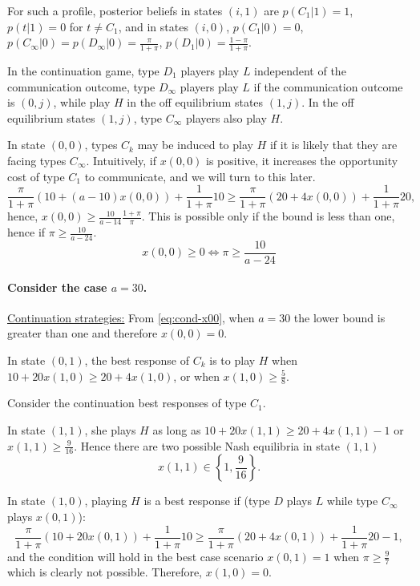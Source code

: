 \documentclass[12pt]{article}
\theoremstyle{definition}
\theoremstyle{remark}
\begin{document}
For such a profile, posterior beliefs in states $(i,1)$  are $p(C_1|1)=1$, $p(t|1)=0$ for $t\neq C_1$, and in states $(i,0)$, $p(C_1|0)=0$, $p(C_\infty|0)=p(D_\infty|0)=\frac{\pi}{1+\pi}$, $p(D_1|0)=\frac{1-\pi}{1+\pi}$.

In the continuation game, type $D_1$ players play $L$ independent of the communication outcome, type $D_\infty$ players play $L$ if the communication outcome is $(0,j)$, while play $H$ in the off equilibrium states $(1,j)$. In the off equilibrium states $(1,j)$, type $C_\infty$ players also play $H$.

In state $(0,0)$, types $C_k$ may be induced to play $H$ if it is likely that they are facing types $C_\infty$. Intuitively, if $x(0,0)$ is positive, it increases the opportunity cost of type $C_1$ to communicate, and we will turn to this later.
\[
\frac{\pi}{1+\pi}(10+(a-10)x(0,0))+\frac{1}{1+\pi}10\geq \frac{\pi}{1+\pi}(20+4x(0,0))+\frac{1}{1+\pi}20, 
\]
hence, $x(0,0)\geq \frac{10}{a-14}\frac{1+\pi}{\pi}$. This is possible only if the bound is less than one, hence if $\pi\geq \frac{10}{a-24}$.
\begin{equation}\label{eq:cond-x00}
    x(0,0)\geq 0 \Leftrightarrow \pi\geq \frac{10}{a-24}
\end{equation}
%

\paragraph{Consider the case $a=30$.} \underline{Continuation strategies:} From \eqref{eq:cond-x00}, when $a=30$ the lower bound is greater than one and therefore $x(0,0)=0$.

In state $(0,1)$, the best response of $C_k$ is to play $H$ when $10+20x(1,0)\geq 20+4x(1,0)$, or when $x(1,0)\geq \frac{5}{8}$.

Consider the continuation best responses of type $C_1$. 

In state $(1,1)$, she plays $H$ as long as $10+20x(1,1)\geq 20+4x(1,1)-1$ or $x(1,1)\geq \frac{9}{16}$. Hence there are two possible Nash equilibria in state $(1,1)$
\begin{equation}\label{BR-11}
	x(1,1)\in\left\{1,\frac{9}{16}\right\}.
\end{equation}

In state $(1,0)$, playing $H$ is a best response if (type $D$ plays $L$ while type $C_\infty$ plays $x(0,1)$):
\[
\frac{\pi}{1+\pi}(10+20 x(0,1))+\frac{1}{1+\pi}10\geq \frac{\pi}{1+\pi}(20+4 x(0,1))+\frac{1}{1+\pi}20 -1,
\]
and the condition will hold in the best case scenario $x(0,1)=1$ when $\pi\geq \frac{9}{7}$ which is clearly not possible. Therefore, $x(1,0)=0$. 
\end{document}
